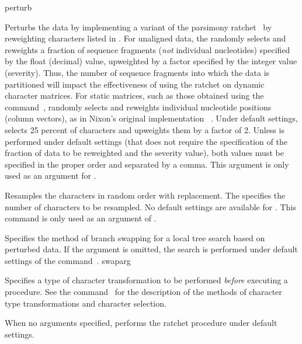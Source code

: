 \begin{command}{perturb}{}
\begin{arguments}
{Perturbs the data by implementing a variant of the parsimony
ratchet~\cite{Nixon1999} by reweighting characters listed in 
. For unaligned data, the  
randomly selects and reweights a fraction of sequence fragments 
(\emph{not} individual nucleotides) specified by the float (decimal) 
value, upweighted by a factor specified by the integer value 
(severity). Thus, the number of sequence fragments into which the 
data is partitioned will impact the effectiveness of using the 
ratchet on dynamic character matrices. For static matrices, such 
as those obtained using the command~, 
 randomly selects and reweights individual 
nucleotide positions (column vectors), as in Nixon's original 
implementation ~\cite{Nixon1999}. Under default settings,
 selects 25 percent of characters and upweights
them by a factor of 2. Unless  is performed
under default settings (that does not require the specification of 
the fraction of data to be reweighted and the severity value), both
values must be specified in the proper order and separated by a 
comma. This argument is only used as an argument for 
.}
{}

{Resamples the characters in random order with
replacement. The \poyint specifies the number of characters to be resampled.
No default settings are available for . This
command is only used as an argument of .}
{}

{Specifies the method of branch swapping for a local tree search
based on perturbed data. If the argument 
is omitted, the search is performed under default settings of the
command~.}
{swaparg}

{Specifies a type of character transformation to be performed
\emph{before} executing a  procedure.
See the command~ for
the description of the methods of character type transformations
and character selection.}
{}

\end{arguments}

{When no arguments specified, \poy performs the ratchet procedure under
default settings.}


\end{command}
